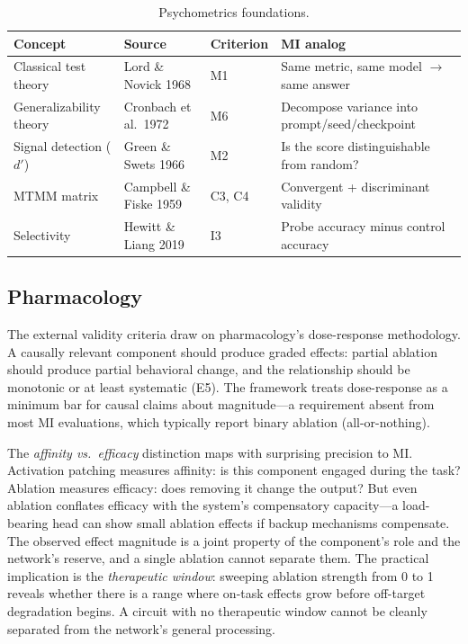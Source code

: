 \documentclass[10pt]{article}
\begin{document}
\begin{table}[H]
\centering\small
\caption{Psychometrics foundations.}
\renewcommand{\arraystretch}{1.12}
\begin{tabular}{@{}l>{\raggedright\arraybackslash}p{2.2cm}l>{\raggedright\arraybackslash}p{4.5cm}@{}}
\toprule
\textbf{Concept} & \textbf{Source} & \textbf{Criterion} & \textbf{MI analog} \\
\midrule
Classical test theory & Lord \& Novick 1968 & M1 & Same metric, same model $\to$ same answer \\
\midrule
Generalizability theory & Cronbach et al.\ 1972 & M6 & Decompose variance into prompt/seed/checkpoint \\
\midrule
Signal detection ($d'$) & Green \& Swets 1966 & M2 & Is the score distinguishable from random? \\
\midrule
MTMM matrix & Campbell \& Fiske 1959 & C3, C4 & Convergent + discriminant validity \\
\midrule
Selectivity & Hewitt \& Liang 2019 & I3 & Probe accuracy minus control accuracy \\
\bottomrule
\end{tabular}
\end{table}

\subsection{Pharmacology}
\label{sec:pharma}

The external validity criteria draw on pharmacology's dose-response methodology. A causally relevant component should produce graded effects: partial ablation should produce partial behavioral change, and the relationship should be monotonic or at least systematic (E5). The framework treats dose-response as a minimum bar for causal claims about magnitude---a requirement absent from most MI evaluations, which typically report binary ablation (all-or-nothing).

The \emph{affinity vs.\ efficacy} distinction maps with surprising precision to MI. Activation patching measures affinity: is this component engaged during the task? Ablation measures efficacy: does removing it change the output? But even ablation conflates efficacy with the system's compensatory capacity---a load-bearing head can show small ablation effects if backup mechanisms compensate. The observed effect magnitude is a joint property of the component's role and the network's reserve, and a single ablation cannot separate them. The practical implication is the \emph{therapeutic window}: sweeping ablation strength from 0 to 1 reveals whether there is a range where on-task effects grow before off-target degradation begins. A circuit with no therapeutic window cannot be cleanly separated from the network's general processing.
\end{document}
